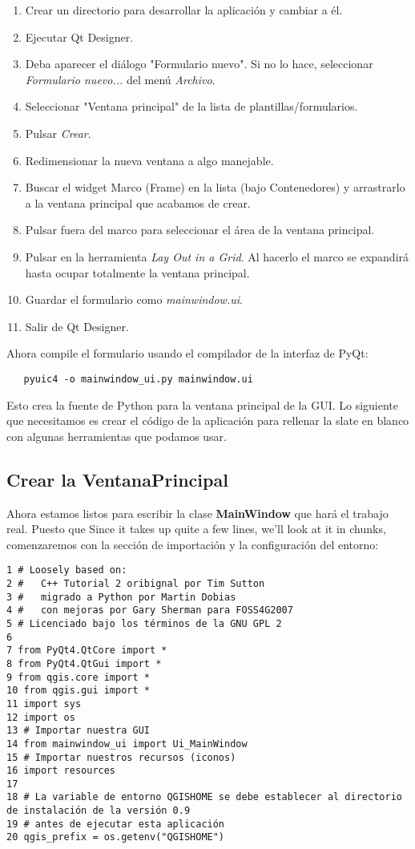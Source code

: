 \begin{enumerate}
\item Crear un directorio para desarrollar la aplicación y cambiar a él.
\item Ejecutar Qt Designer.
\item Deba aparecer el diálogo "Formulario nuevo". Si no lo hace, seleccionar 
\textsl{Formulario nuevo...} del menú \textsl{Archivo}.
\item Seleccionar "Ventana principal" de la lista de plantillas/formularios.
\item Pulsar \textsl{Crear}.
\item Redimensionar la nueva ventana a algo manejable.
\item Buscar el widget Marco (Frame) en la lista (bajo Contenedores) y arrastrarlo a la ventana principal
que acabamos de crear.
\item Pulsar fuera del marco para seleccionar el área de la ventana principal.
\item Pulsar en la herramienta \textsl{Lay Out in a Grid}. Al hacerlo el marco se expandirá hasta
ocupar totalmente la ventana principal.
\item Guardar el formulario como \textsl{mainwindow.ui}.
\item Salir de Qt Designer.
\end{enumerate} 

Ahora compile el formulario usando el compilador de la interfaz de PyQt:

\begin{verbatim}
   pyuic4 -o mainwindow_ui.py mainwindow.ui
\end{verbatim}

Esto crea la fuente de Python para la ventana principal de la GUI. Lo siguiente que necesitamos es crear
el código de la aplicación para rellenar la slate en blanco con algunas herramientas que podamos usar.

\subsection{Crear la VentanaPrincipal}

Ahora estamos listos para escribir la clase \textbf{MainWindow} que hará el trabajo real. Puesto que
Since it takes up quite a few lines, we'll look at it in chunks, comenzaremos con la sección de
importación y la configuración del entorno:

\begin{verbatim}
1 # Loosely based on:
2 #   C++ Tutorial 2 oribignal por Tim Sutton
3 #   migrado a Python por Martin Dobias
4 #   con mejoras por Gary Sherman para FOSS4G2007
5 # Licenciado bajo los términos de la GNU GPL 2
6
7 from PyQt4.QtCore import *
8 from PyQt4.QtGui import *
9 from qgis.core import *
10 from qgis.gui import *
11 import sys
12 import os
13 # Importar nuestra GUI
14 from mainwindow_ui import Ui_MainWindow
15 # Importar nuestros recursos (iconos)
16 import resources
17 
18 # La variable de entorno QGISHOME se debe establecer al directorio de instalación de la versión 0.9
19 # antes de ejecutar esta aplicación
20 qgis_prefix = os.getenv("QGISHOME")
\end{verbatim}

